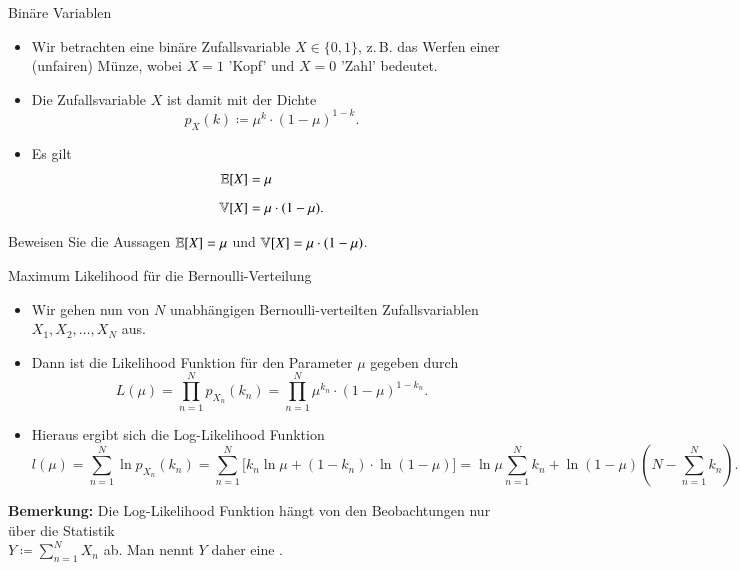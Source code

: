 \begin{frame}{Binäre Variablen}{}
	\begin{itemize}
		\item Wir betrachten eine binäre Zufallsvariable $X \in \{ 0, 1 \}$, z.\,B. das Werfen einer (unfairen) Münze,
			wobei $X = 1$ 'Kopf' und $X = 0$ 'Zahl' bedeutet.
		\item Die Zufallsvariable $X$ ist damit  mit der Dichte
		\begin{equation} \label{eq:bernoulli}
			p_X(k) \coloneqq \mu^k \cdot (1 - \mu)^{1 - k}.
		\end{equation}
		\item Es gilt
		\begin{align*}
			\mathbb{E}[X]
				&= \mu
		\\[2mm]
			\mathbb{V}[X]
				&= \mu \cdot (1 - \mu).
		\end{align*}
	\end{itemize}
	
	\begin{mytask}
		Beweisen Sie die Aussagen $\mathbb{E}[X] = \mu$ und $\mathbb{V}[X] = \mu \cdot (1 - \mu)$.
	\end{mytask}
\end{frame}


\begin{frame}{Maximum Likelihood für die Bernoulli-Verteilung}{}
	\begin{itemize}
		\item Wir gehen nun von $N$ unabhängigen Bernoulli-verteilten Zufallsvariablen $X_1, X_2, \ldots, X_N$ aus.
		\item Dann ist die Likelihood Funktion für den Parameter $\mu$ gegeben durch
		\begin{equation*}
			L(\mu) = \prod_{n=1}^N p_{X_n}(k_n) = \prod_{n=1}^N \mu^{k_n} \cdot (1 - \mu)^{1 - k_n}.
		\end{equation*}
		\item Hieraus ergibt sich die Log-Likelihood Funktion
		\begin{equation*}
			l(\mu)
				= \sum_{n=1}^N \ln p_{X_n}(k_n)
				= \sum_{n=1}^N \bigl[ k_n \ln \mu + (1 - k_n) \cdot \ln(1 - \mu) \bigr]
				= \ln \mu \sum_{n=1}^N k_n + \ln(1 - \mu) \left( N - \sum_{n=1}^N k_n \right).
		\end{equation*}
	\end{itemize}
	
	\begin{boxGray}
		\textbf{Bemerkung:} Die Log-Likelihood Funktion hängt von den Beobachtungen nur über die Statistik \\
		$Y \coloneqq \sum_{n=1}^N X_n$ ab. Man nennt $Y$ daher eine .
	\end{boxGray}
\end{frame}


